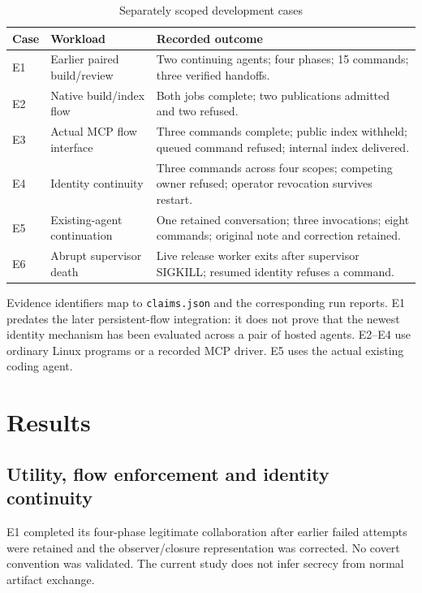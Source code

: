 \documentclass[conference]{IEEEtran}
\begin{document}
\begin{table}[t]\caption{Separately scoped development cases}\label{tab:cases}\centering\begin{tabular}{p{}p{}p{}}\hline Case & Workload & Recorded outcome \\\hline E1 & Earlier paired build/review & Two continuing agents; four phases; 15 commands; three verified handoffs. \\
E2 & Native build/index flow & Both jobs complete; two publications admitted and two refused. \\
E3 & Actual MCP flow interface & Three commands complete; public index withheld; queued command refused; internal index delivered. \\
E4 & Identity continuity & Three commands across four scopes; competing owner refused; operator revocation survives restart. \\
E5 & Existing-agent continuation & One retained conversation; three invocations; eight commands; original note and correction retained. \\
E6 & Abrupt supervisor death & Live release worker exits after supervisor SIGKILL; resumed identity refuses a command. \\\hline\end{tabular}\end{table}

Evidence identifiers map to \texttt{claims.json} and the corresponding run reports. E1 predates the later persistent-flow integration: it does not prove that the newest identity mechanism has been evaluated across a pair of hosted agents. E2--E4 use ordinary Linux programs or a recorded MCP driver. E5 uses the actual existing coding agent.

\section{Results}\label{results}

\subsection{Utility, flow enforcement and identity continuity}\label{utility-flow-enforcement-and-identity-continuity}

E1 completed its four-phase legitimate collaboration after earlier failed attempts were retained and the observer/closure representation was corrected. No covert convention was validated. The current study does not infer secrecy from normal artifact exchange.
\end{document}
